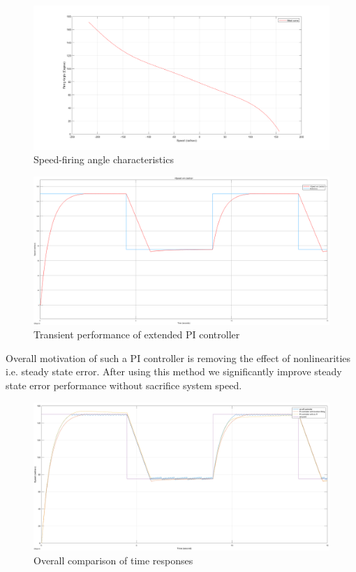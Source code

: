 \documentclass[fleqn, a4paper]{report}
\begin{document}
\begin{figure}[H]
    \centering
    \includegraphics[width=10 cm]{function_fitting.png}
    \caption{Speed-firing angle characteristics}
    \label{fig:my_label}
\end{figure}
\begin{figure}[H]
    \centering
    \includegraphics[width=10 cm]{pi_controller.png}
    \caption{Transient performance of extended PI controller}
    \label{fig:my_label}
\end{figure}
Overall motivation of such a PI controller is removing the effect of nonlinearities i.e. steady state error. After using this method we significantly improve steady state error performance without sacrifice system speed. 
\begin{figure}[H]
    \centering
    \includegraphics[width=10 cm]{all_controllers.png}
    \caption{Overall comparison of time responses}
    \label{fig:my_label}
\end{figure}
\end{document}
